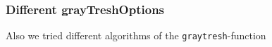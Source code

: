 \documentclass[11pt,a4paper]{scartcle}
\begin{document}
%
%
%

\hypertarget{different-graytreshoptions}{%
\subsubsection{Different
grayTreshOptions}\label{different-graytreshoptions}}

Also we tried different algorithms of the \texttt{graytresh}-function
\end{document}
